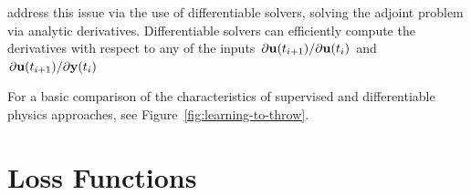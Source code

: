 \cite{holl2019pdecontrol} address this issue via the use of differentiable
solvers, solving the adjoint problem  via analytic derivatives.
Differentiable solvers can efficiently compute the derivatives with respect to
any of the inputs $\pdv*{\vb{u}(t_{i+1})}{\vb{u}(t_i)}$ and
$\pdv*{\vb{u}(t_{i+1})}{\vb{y}(t_i)}$




For a basic comparison of the characteristics of supervised and differentiable
physics approaches, see Figure~\ref{fig:learning-to-throw}.

\section{Loss Functions}

